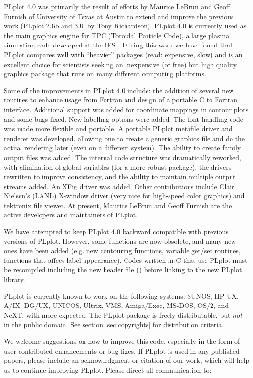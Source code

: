 PLplot 4.0 was primarily the result of efforts by Maurice LeBrun and
Geoff Furnish of University of Texas at Austin to extend and improve
the previous work (PLplot 2.6b and 3.0, by Tony Richardson).  PLplot
4.0 is currently used as the main graphics engine for TPC (Toroidal
Particle Code), a large plasma simulation code developed at the IFS
\cite{lebrun89a}.  During this work we have found that PLplot compares
well with ``heavier'' packages (read: expensive, slow) and is an
excellent choice for scientists seeking an inexpensive (or free) but
high quality graphics package that runs on many different computing
platforms.

Some of the improvements in PLplot 4.0 include: the addition of
several new routines to enhance usage from Fortran and design of a
portable C to Fortran interface.  Additional support was added for
coordinate mappings in contour plots and some bugs fixed.  New
labelling options were added.  The font handling code was made more
flexible and portable.  A portable PLplot metafile driver and renderer
was developed, allowing one to create a generic graphics file and do
the actual rendering later (even on a different system).  The ability
to create family output files was added.  The internal code structure
was dramatically reworked, with elimination of global variables (for a
more robust package), the drivers rewritten to improve consistency,
and the ability to maintain multiple output streams added.  An XFig
driver was added.  Other contributions include Clair Nielsen's (LANL)
X-window driver (very nice for high-speed color graphics) and
tektronix file viewer.  At present, Maurice LeBrun and Geoff Furnish
are the active developers and maintainers of PLplot.

We have attempted to keep PLplot 4.0 backward compatible with previous
versions of PLplot.  However, some functions are now obsolete, and
many new ones have been added (e.g.  new contouring functions,
variable get/set routines, functions that affect label appearance).
Codes written in C that use PLplot must be recompiled including the
new header file () before linking to the new PLplot
library.

PLplot is currently known to work on the following systems: SUNOS,
HP-UX, A/IX, DG/UX, UNICOS, Ultrix, VMS, Amiga/Exec, MS-DOS, OS/2, and
NeXT, with more expected.  The PLplot package is freely distributable,
but {\em not\/} in the public domain.  See section \ref{sec:copyrights} for
distribution criteria.

We welcome suggestions on how to improve this code, especially in the
form of user-contributed enhancements or bug fixes.  If PLplot is used
in any published papers, please include an acknowledgment or citation
of our work, which will help us to continue improving PLplot.  Please
direct all communication to:

